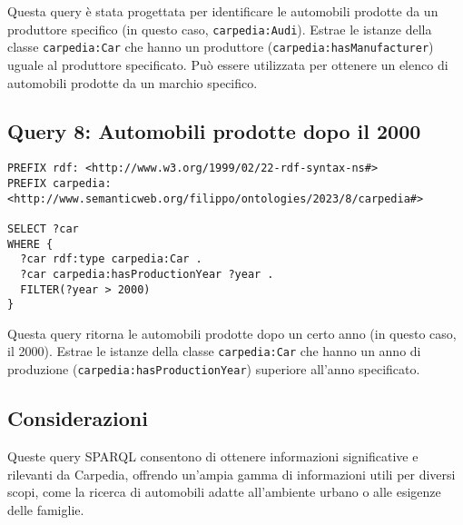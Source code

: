 Questa query è stata progettata per identificare le automobili prodotte da un produttore specifico
(in questo caso, \texttt{carpedia:Audi}). Estrae le istanze della classe \texttt{carpedia:Car} che hanno un produttore
(\texttt{carpedia:hasManufacturer}) uguale al produttore specificato. Può essere utilizzata per ottenere un elenco
di automobili prodotte da un marchio specifico.

\subsection{Query 8: Automobili prodotte dopo il 2000}

\begin{lstlisting}[language=SPARQL]
PREFIX rdf: <http://www.w3.org/1999/02/22-rdf-syntax-ns#>
PREFIX carpedia: <http://www.semanticweb.org/filippo/ontologies/2023/8/carpedia#>

SELECT ?car
WHERE {
  ?car rdf:type carpedia:Car .
  ?car carpedia:hasProductionYear ?year .
  FILTER(?year > 2000)
}
\end{lstlisting}


Questa query ritorna le automobili prodotte dopo un certo anno (in questo caso, il 2000). Estrae le istanze della classe \texttt{carpedia:Car} che hanno un anno di produzione (\texttt{carpedia:hasProductionYear}) superiore all'anno specificato.

\subsection{Considerazioni}
Queste query SPARQL consentono di ottenere informazioni significative e rilevanti da Carpedia, offrendo un'ampia gamma di informazioni utili per diversi scopi, come la ricerca di automobili adatte all'ambiente urbano o alle esigenze delle famiglie.
